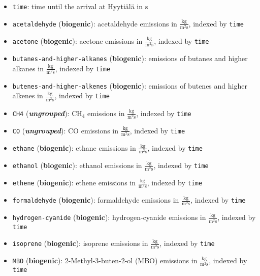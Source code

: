 \begin{itemize}
    \item \texttt{time}: time until the arrival at Hyyti\"al\"a in $\text{s}$
    \item \texttt{acetaldehyde} (\textbf{biogenic}): acetaldehyde emissions in $\frac{\text{kg}}{\text{m}^2 \text{s}}$, indexed by \texttt{time}
    \item \texttt{acetone} (\textbf{biogenic}): acetone emissions in $\frac{\text{kg}}{\text{m}^2 \text{s}}$, indexed by \texttt{time}
    \item \texttt{butanes-and-higher-alkanes} (\textbf{biogenic}): emissions of butanes and higher alkanes in $\frac{\text{kg}}{\text{m}^2 \text{s}}$, indexed by \texttt{time}
    \item \texttt{butenes-and-higher-alkenes} (\textbf{biogenic}): emissions of butenes and higher alkenes in $\frac{\text{kg}}{\text{m}^2 \text{s}}$, indexed by \texttt{time}
    \item \texttt{CH4} (\textit{\textbf{ungrouped}}): $\text{CH}_{4}$ emissions in $\frac{\text{kg}}{\text{m}^2 \text{s}}$, indexed by \texttt{time}
    \item \texttt{CO} (\textit{\textbf{ungrouped}}): $\text{CO}$ emissions in $\frac{\text{kg}}{\text{m}^2 \text{s}}$, indexed by \texttt{time}
    \item \texttt{ethane} (\textbf{biogenic}): ethane emissions in $\frac{\text{kg}}{\text{m}^2 \text{s}}$, indexed by \texttt{time}
    \item \texttt{ethanol} (\textbf{biogenic}): ethanol emissions in $\frac{\text{kg}}{\text{m}^2 \text{s}}$, indexed by \texttt{time}
    \item \texttt{ethene} (\textbf{biogenic}): ethene emissions in $\frac{\text{kg}}{\text{m}^2 \text{s}}$, indexed by \texttt{time}
    \item \texttt{formaldehyde} (\textbf{biogenic}): formaldehyde emissions in $\frac{\text{kg}}{\text{m}^2 \text{s}}$, indexed by \texttt{time}
    \item \texttt{hydrogen-cyanide} (\textbf{biogenic}): hydrogen-cyanide emissions in $\frac{\text{kg}}{\text{m}^2 \text{s}}$, indexed by \texttt{time}
    \item \texttt{isoprene} (\textbf{biogenic}): isoprene emissions in $\frac{\text{kg}}{\text{m}^2 \text{s}}$, indexed by \texttt{time}
    \item \texttt{MBO} (\textbf{biogenic}): 2-Methyl-3-buten-2-ol (MBO) emissions in $\frac{\text{kg}}{\text{m}^2 \text{s}}$, indexed by \texttt{time}

\end{itemize}

